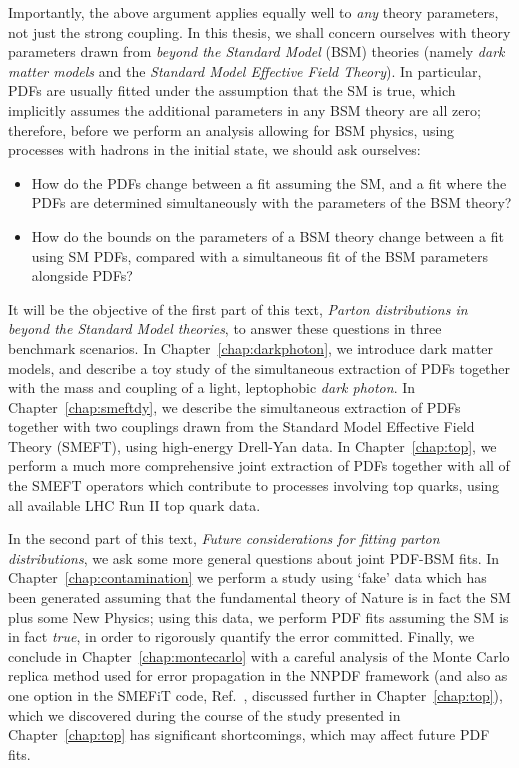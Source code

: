 \documentclass[withindex,glossary]{cam-thesis}
\begin{document}
\noindent Importantly, the above argument applies equally well to \textit{any} theory parameters, not just the strong coupling. In this thesis, we shall concern ourselves with theory parameters drawn from \textit{beyond the Standard Model} (BSM) theories (namely \textit{dark matter models} and the \textit{Standard Model Effective Field Theory}). In particular, PDFs are usually fitted under the assumption that the SM is true, which implicitly assumes the additional parameters in any BSM theory are all zero; therefore, before we perform an analysis allowing for BSM physics, using processes with hadrons in the initial state, we should ask ourselves:
\begin{itemize}
\item How do the PDFs change between a fit assuming the SM, and a fit where the PDFs are determined simultaneously with the parameters of the BSM theory?
\item How do the bounds on the parameters of a BSM theory change between a fit using SM PDFs, compared with a simultaneous fit of the BSM parameters alongside PDFs?
\end{itemize}

It will be the objective of the first part of this text, \textit{Parton distributions in beyond the Standard Model theories}, to answer these questions in three benchmark scenarios. In Chapter~\ref{chap:darkphoton}, we introduce dark matter models, and describe a toy study of the simultaneous extraction of PDFs together with the mass and coupling of a light, leptophobic \textit{dark photon}. In Chapter~\ref{chap:smeftdy}, we describe the simultaneous extraction of PDFs together with two couplings drawn from the Standard Model Effective Field Theory (SMEFT), using high-energy Drell-Yan data. In Chapter~\ref{chap:top}, we perform a much more comprehensive joint extraction of PDFs together with all of the SMEFT operators which contribute to processes involving top quarks, using all available LHC Run II top quark data.

In the second part of this text, \textit{Future considerations for fitting parton distributions}, we ask some more general questions about joint PDF-BSM fits. In Chapter~\ref{chap:contamination} we perform a study using `fake' data which has been generated assuming that the fundamental theory of Nature is in fact the SM plus some New Physics; using this data, we perform PDF fits assuming the SM is in fact \textit{true}, in order to rigorously quantify the error committed. Finally, we conclude in Chapter~\ref{chap:montecarlo} with a careful analysis of the Monte Carlo replica method used for error propagation in the NNPDF framework (and also as one option in the SMEFiT code, Ref.~\cite{Giani:2023gfq}, discussed further in Chapter~\ref{chap:top}), which we discovered during the course of the study presented in Chapter~\ref{chap:top} has significant shortcomings, which may affect future PDF fits.
\end{document}
